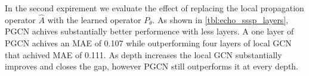 In the second expirement we evaluate the effect of replacing the local
propagation operator $\hat A$ with the learned operator $P_\theta$. As shown in
\ref{tbl:echo_sssp_layers}, PGCN achives substantially better performence with
less layers. A one layer of PGCN achives an MAE of 0.107 while outperforming
four layers of local GCN that achived MAE of 0.111. As depth increases the
local GCN substantially improves and closes the gap, however PGCN still
outperforms it at every depth.
